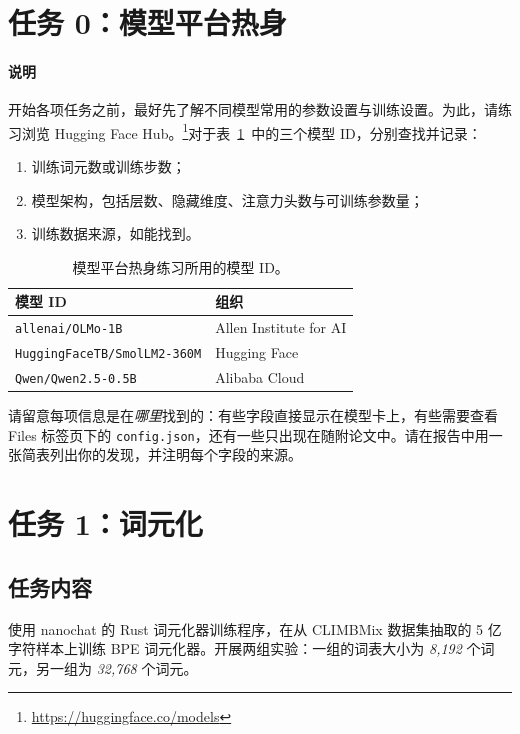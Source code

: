\section{任务 0：模型平台热身}
\paragraph{说明} 开始各项任务之前，最好先了解不同模型常用的参数设置与训练设置。为此，请练习浏览 Hugging Face Hub。\footnote{\url{https://huggingface.co/models}}对于表~\ref{tab:hub-warmup}~中的三个模型 ID，分别查找并记录：
\begin{enumerate}[label=\arabic*.]
    \item 训练词元数或训练步数；
    \item 模型架构，包括层数、隐藏维度、注意力头数与可训练参数量；
    \item 训练数据来源，如能找到。
\end{enumerate}

\begin{table}[h]
\centering

\begin{tabular}{ll}
\toprule
\textbf{模型 ID} & \textbf{组织} \\
\midrule
\texttt{allenai/OLMo-1B}            & Allen Institute for AI \\
\texttt{HuggingFaceTB/SmolLM2-360M} & Hugging Face \\
\texttt{Qwen/Qwen2.5-0.5B}          & Alibaba Cloud \\
\bottomrule
\end{tabular}
\caption{模型平台热身练习所用的模型 ID。}
\label{tab:hub-warmup}
\end{table}

请留意每项信息是在\emph{哪里}找到的：有些字段直接显示在模型卡上，有些需要查看 Files 标签页下的 \texttt{config.json}，还有一些只出现在随附论文中。请在报告中用一张简表列出你的发现，并注明每个字段的来源。

\section{任务 1：词元化}
\label{sec:task1}

\subsection{任务内容}

使用 nanochat 的 Rust 词元化器训练程序，在从 CLIMBMix 数据集抽取的 5 亿字符样本上训练 BPE 词元化器。开展两组实验：一组的词表大小为 \textit{8{,}192} 个词元，另一组为 \textit{32{,}768} 个词元。

